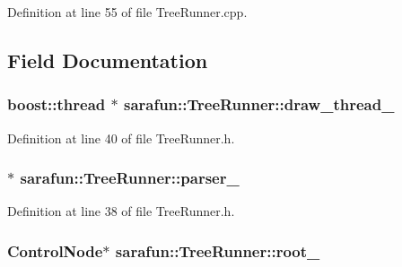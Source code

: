Definition at line 55 of file Tree\-Runner.\-cpp.



\subsection{Field Documentation}
\hypertarget{classsarafun_1_1TreeRunner_a2b675fc3cda6b8b578196c2578d937bb_a2b675fc3cda6b8b578196c2578d937bb}{
\subsubsection[{draw\-\_\-thread\-\_\-}]{\setlength{\rightskip}{0pt plus 5cm}boost\-::thread $\ast$ sarafun\-::\-Tree\-Runner\-::draw\-\_\-thread\-\_\-\hspace{0.3cm}{\ttfamily [private]}}}\label{classsarafun_1_1TreeRunner_a2b675fc3cda6b8b578196c2578d937bb_a2b675fc3cda6b8b578196c2578d937bb}


Definition at line 40 of file Tree\-Runner.\-h.

\hypertarget{classsarafun_1_1TreeRunner_a76ee0cb14aa5aedce70ca5e8ebf2b7a4_a76ee0cb14aa5aedce70ca5e8ebf2b7a4}{
\subsubsection[{parser\-\_\-}]{$\ast$ sarafun\-::\-Tree\-Runner\-::parser\-\_\-\hspace{0.3cm}{\ttfamily [private]}}}\label{classsarafun_1_1TreeRunner_a76ee0cb14aa5aedce70ca5e8ebf2b7a4_a76ee0cb14aa5aedce70ca5e8ebf2b7a4}


Definition at line 38 of file Tree\-Runner.\-h.

\hypertarget{classsarafun_1_1TreeRunner_ab867d518280fff9414b5e12732837164_ab867d518280fff9414b5e12732837164}{
\subsubsection[{root\-\_\-}]{\setlength{\rightskip}{0pt plus 5cm}Control\-Node$\ast$ sarafun\-::\-Tree\-Runner\-::root\-\_\-\hspace{0.3cm}{\ttfamily [private]}}}\label{classsarafun_1_1TreeRunner_ab867d518280fff9414b5e12732837164_ab867d518280fff9414b5e12732837164}


